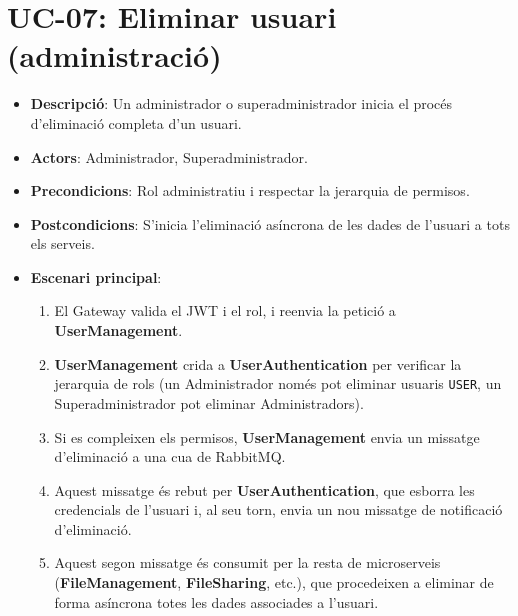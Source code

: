 \section{UC-07: Eliminar usuari (administració)}
\begin{itemize}
    \item \textbf{Descripció}: Un administrador o superadministrador inicia el procés d'eliminació completa d'un usuari.
    \item \textbf{Actors}: Administrador, Superadministrador.
    \item \textbf{Precondicions}: Rol administratiu i respectar la jerarquia de permisos.
    \item \textbf{Postcondicions}: S'inicia l'eliminació asíncrona de les dades de l'usuari a tots els serveis.
    \item \textbf{Escenari principal}:
    \begin{enumerate}
        \item El Gateway valida el JWT i el rol, i reenvia la petició a \textbf{UserManagement}.
        \item \textbf{UserManagement} crida a \textbf{UserAuthentication} per verificar la jerarquia de rols (un Administrador només pot eliminar usuaris \texttt{USER}, un Superadministrador pot eliminar Administradors).
        \item Si es compleixen els permisos, \textbf{UserManagement} envia un missatge d'eliminació a una cua de RabbitMQ.
        \item Aquest missatge és rebut per \textbf{UserAuthentication}, que esborra les credencials de l'usuari i, al seu torn, envia un nou missatge de notificació d'eliminació.
        \item Aquest segon missatge és consumit per la resta de microserveis (\textbf{FileManagement}, \textbf{FileSharing}, etc.), que procedeixen a eliminar de forma asíncrona totes les dades associades a l'usuari.
    \end{enumerate}
\end{itemize}

